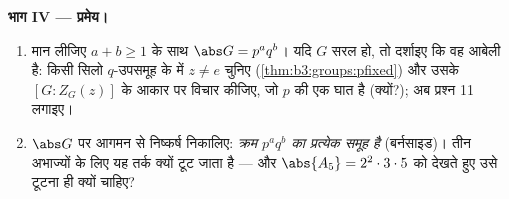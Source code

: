 \begin{problem}[{सप्ताहांत समस्या --- क्रम $p^aq^b$ के समूहों की
विलेयता}]
\medskip
\noindent\textbf{भाग IV --- प्रमेय।}
\begin{enumerate}[resume]
  \item मान लीजिए $a + b \geq 1$ के साथ $\abs G = p^aq^b$। यदि $G$ सरल हो, तो
        दर्शाइए कि वह आबेली है: किसी सिलो $q$-उपसमूह के 
        में $z \neq e$ चुनिए (\cref{thm:b3:groups:pfixed}) और उसके  $[G : Z_G(z)]$ के
        आकार पर विचार कीजिए, जो $p$ की एक घात है (क्यों?);
        अब प्रश्न 11 लगाइए।
  \item $\abs G$ पर आगमन से निष्कर्ष निकालिए: \emph{क्रम $p^aq^b$ का
        प्रत्येक समूह  है} (बर्नसाइड)। तीन अभाज्यों के लिए
        यह तर्क क्यों टूट जाता है --- और $\abs{A_5} = 2^2\cdot3\cdot5$ को देखते हुए उसे
        टूटना ही क्यों चाहिए?
\end{enumerate}


\end{problem}
